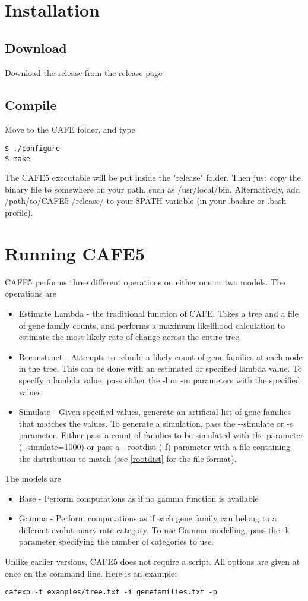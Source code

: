 \documentclass{article}
\newcommand{\shortname}{CAFE5 }
\begin{document}
\section{Installation}
\subsection{Download}
Download the release from the release page
\subsection{Compile}
Move to the CAFE folder, and type
\begin{lstlisting}
$ ./configure
$ make
\end{lstlisting}

The \shortname executable will be put inside the "release" folder.
Then just copy the binary file to somewhere on your path, such as /usr/local/bin. Alternatively, add /path/to/\shortname/release/ to your \$PATH variable (in your .bashrc or .bash profile).

\newpage
\section{Running \shortname}
\shortname performs three different operations on either one or two models. The operations are 
\begin{itemize}
    \item Estimate Lambda - the traditional function of CAFE. Takes a tree and a file of gene family counts, and performs a maximum likelihood calculation to estimate the most likely rate of change across the entire tree.
    \item Reconstruct - Attempts to rebuild a likely count of gene families at each node in the tree. This can be done with an estimated or specified lambda value. To specify a lambda value, pass either the -l or -m parameters with the specified values.
    \item Simulate - Given specified values, generate an artificial list of gene families that matches the values. To generate a simulation, pass the -{}-simulate or -s parameter. Either pass a count of families to be simulated with the parameter (-{}-simulate=1000) or pass a -{}-rootdist (-f) parameter with a file containing the distribution to match (see \ref{rootdist} for the file format).
\end{itemize}
The models are
\begin{itemize}
    \item Base - Perform computations as if no gamma function is available
    \item Gamma - Perform computations as if each gene family can belong to a different evolutionary rate category. To use Gamma modelling, pass the -k parameter specifying the number of categories to use.
\end{itemize}
Unlike earlier versions, \shortname does not require a script. All options are given at once on the command line. Here is an example:
\begin{lstlisting}
cafexp -t examples/tree.txt -i genefamilies.txt -p
\end{lstlisting}
\end{document}
